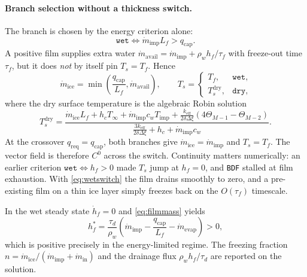 \documentclass[11pt,a4paper]{article}
\newcommand{\Ts}{T_s}
\newcommand{\Tinf}{T_\infty}
\newcommand{\Tf}{T_f}
\newcommand{\Timp}{T_{\mathrm{imp}}}
\newcommand{\Lf}{L_f}
\newcommand{\keff}{k_{\mathrm{eff}}}
\newcommand{\mdot}{\dot m}
\begin{document}
\paragraph{Branch selection without a thickness switch.}
The branch is chosen by the energy criterion alone:
\begin{equation}\label{eq:wetswitch}
  \texttt{wet}\iff \mdot_{\mathrm{imp}}\Lf>q_{\mathrm{cap}} .
\end{equation}
A positive film supplies extra water
$\mdot_{\mathrm{avail}}=\mdot_{\mathrm{imp}}+\rho_w h_f/\tau_f$ with freeze-out time
$\tau_f$, but it does \emph{not} by itself pin $\Ts=\Tf$. Hence
\begin{equation}\label{eq:filmclosure}
  \mdot_{\mathrm{ice}}=\min\!\left(\frac{q_{\mathrm{cap}}}{\Lf},\mdot_{\mathrm{avail}}\right),
  \qquad
  \Ts=\begin{cases}
    \Tf, & \texttt{wet},\\[3pt]
    \Ts^{\mathrm{dry}}, & \texttt{dry},
  \end{cases}
\end{equation}
where the dry surface temperature is the algebraic Robin solution
\begin{equation}\label{eq:dryTsfull}
  \Ts^{\mathrm{dry}}=
  \frac{\mdot_{\mathrm{ice}}\Lf+h_c\Tinf+\mdot_{\mathrm{imp}}c_w\Timp
       +\frac{\keff}{2\delta\Delta\xi}(4\Theta_{M-1}-\Theta_{M-2})}
       {\frac{3\keff}{2\delta\Delta\xi}+h_c+\mdot_{\mathrm{imp}}c_w}.
\end{equation}
At the crossover $q_{\mathrm{req}}=q_{\mathrm{cap}}$, both branches give
$\mdot_{\mathrm{ice}}=\mdot_{\mathrm{imp}}$ and $\Ts=\Tf$. The vector field is therefore
$C^0$ across the switch. Continuity matters numerically: an earlier criterion
$\texttt{wet}\iff h_f>0$ made $\Ts$ jump at $h_f=0$, and \texttt{BDF} stalled at film
exhaustion. With \eqref{eq:wetswitch} the film drains smoothly to zero, and a
pre-existing film on a thin ice layer simply freezes back on the $O(\tau_f)$ timescale.

In the wet steady state $\dot h_f=0$ and \eqref{eq:filmmass} yields
\begin{equation}\label{eq:filmsteady}
  h_f^*=\frac{\tau_d}{\rho_w}\left(\mdot_{\mathrm{imp}}
        -\frac{q_{\mathrm{cap}}}{\Lf}-\mdot_{\mathrm{evap}}\right)>0 ,
\end{equation}
which is positive precisely in the energy-limited regime. The freezing fraction
$n=\mdot_{\mathrm{ice}}/(\mdot_{\mathrm{imp}}+\mdot_{\mathrm{in}})$ and the drainage flux
$\rho_w h_f/\tau_d$ are reported on the solution.
\end{document}
